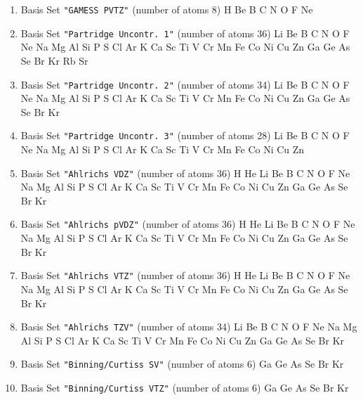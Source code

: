 \begin{enumerate}
\item Basis Set \verb#"GAMESS PVTZ"# (number of atoms 8)  \newline
  H Be B C N O F Ne


\item Basis Set \verb#"Partridge Uncontr. 1"# (number of atoms 36)  \newline
  Li Be B C N O F Ne Na Mg Al Si P S Cl Ar K Ca Sc Ti V Cr Mn Fe Co
 Ni Cu Zn Ga Ge As Se Br Kr Rb Sr


\item Basis Set \verb#"Partridge Uncontr. 2"# (number of atoms 34)  \newline
  Li Be B C N O F Ne Na Mg Al Si P S Cl Ar K Ca Sc Ti V Cr Mn Fe Co
 Ni Cu Zn Ga Ge As Se Br Kr


\item Basis Set \verb#"Partridge Uncontr. 3"# (number of atoms 28)  \newline
  Li Be B C N O F Ne Na Mg Al Si P S Cl Ar K Ca Sc Ti V Cr Mn Fe Co
 Ni Cu Zn


\item Basis Set \verb#"Ahlrichs VDZ"# (number of atoms 36)  \newline
  H He Li Be B C N O F Ne Na Mg Al Si P S Cl Ar K Ca Sc Ti V Cr Mn
 Fe Co Ni Cu Zn Ga Ge As Se Br Kr


\item Basis Set \verb#"Ahlrichs pVDZ"# (number of atoms 36)  \newline
  H He Li Be B C N O F Ne Na Mg Al Si P S Cl Ar K Ca Sc Ti V Cr Mn
 Fe Co Ni Cu Zn Ga Ge As Se Br Kr


\item Basis Set \verb#"Ahlrichs VTZ"# (number of atoms 36)  \newline
  H He Li Be B C N O F Ne Na Mg Al Si P S Cl Ar K Ca Sc Ti V Cr Mn
 Fe Co Ni Cu Zn Ga Ge As Se Br Kr


\item Basis Set \verb#"Ahlrichs TZV"# (number of atoms 34)  \newline
  Li Be B C N O F Ne Na Mg Al Si P S Cl Ar K Ca Sc Ti V Cr Mn Fe Co
 Ni Cu Zn Ga Ge As Se Br Kr


\item Basis Set \verb#"Binning/Curtiss SV"# (number of atoms 6)  \newline
  Ga Ge As Se Br Kr

\item Basis Set \verb#"Binning/Curtiss VTZ"# (number of atoms 6)  \newline
  Ga Ge As Se Br Kr



\end{enumerate}

